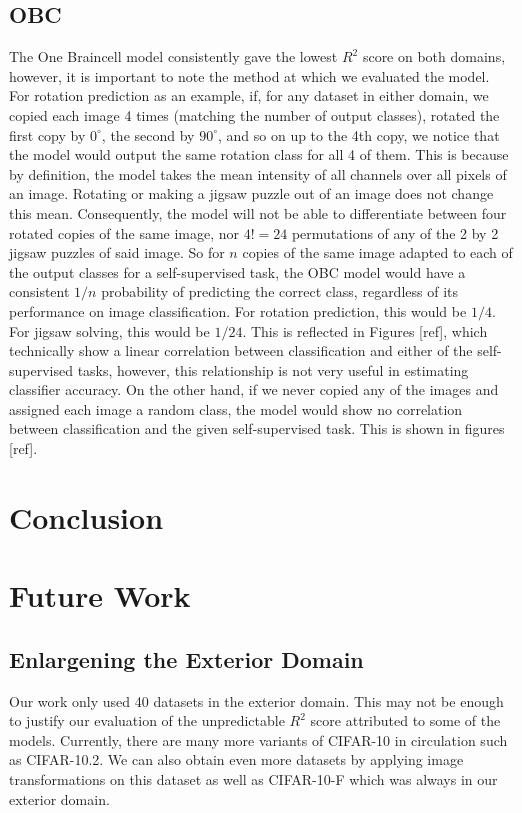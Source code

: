 \documentclass{article}
\begin{document}
\subsection{OBC}
The One Braincell model consistently gave the lowest $R^2$ score on both domains, however, it is important to note the method at which we evaluated the model. For rotation prediction as an example, if, for any dataset in either domain, we copied each image 4 times (matching the number of output classes), rotated the first copy by $0^\circ$, the second by $90^\circ$, and so on up to the 4th copy, we notice that the model would output the same rotation class for all 4 of them. This is because by definition, the model takes the mean intensity of all channels over all pixels of an image. Rotating or making a jigsaw puzzle out of an image does not change this mean. Consequently, the model will not be able to differentiate between four rotated copies of the same image, nor $4! = 24$ permutations of any of the 2 by 2 jigsaw puzzles of said image. So for $n$ copies of the same image adapted to each of the output classes for a self-supervised task, the OBC model would have a consistent $1/n$ probability of predicting the correct class, regardless of its performance on image classification. For rotation prediction, this would be $1/4$. For jigsaw solving, this would be $1/24$. This is reflected in Figures [ref], which technically show a linear correlation between classification and either of the self-supervised tasks, however, this relationship is not very useful in estimating classifier accuracy. On the other hand, if we never copied any of the images and assigned each image a random class, the model would show no correlation between classification and the given self-supervised task. This is shown in figures [ref].

\section{Conclusion}

\section{Future Work}
\subsection{Enlargening the Exterior Domain}
Our work only used 40 datasets in the exterior domain. This may not be enough to justify our evaluation of the unpredictable $R^2$ score attributed to some of the models. Currently, there are many more variants of CIFAR-10 in circulation such as CIFAR-10.2. We can also obtain even more datasets by applying image transformations on this dataset as well as CIFAR-10-F which was always in our exterior domain.
\end{document}
